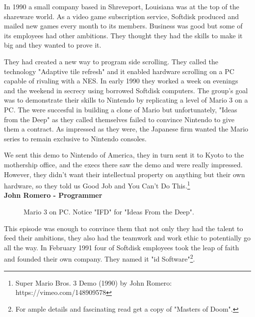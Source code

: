 \documentclass[book.tex]{subfiles}
\begin{document}
In 1990 a small company based in Shreveport, Louisiana was at the top of the shareware world. As a video game subscription service, Softdisk produced and mailed new games every month to its members. Business was good but some of its employees had other ambitions. They thought they had the skills to make it big and they wanted to prove it.\\
\par
They had created a new way to program side scrolling. They called the technology "Adaptive tile refresh" and it enabled hardware scrolling on a PC capable of rivaling with a NES. In early 1990 they worked a week on evenings and the weekend in secrecy using borrowed Softdisk computers. The group's goal was to demonstrate their skills to Nintendo by replicating a level of Mario 3 on a PC. The were succesful in building a clone of Mario  but unfortunately, "Ideas from the Deep" as they called themselves failed to convince Nintendo to give them a contract. As impressed as they were, the Japanese firm wanted the Mario series to remain exclusive to Nintendo consoles.\\
\par
\begin{fancyquotes}
We sent this demo to Nintendo of America, they in turn sent it to Kyoto to the mothership office, and the execs there saw the demo and were really impressed. However, they didn't want their intellectual property on anything but their own hardware, so they told us Good Job and You Can't Do This.\footnote{Super Mario Bros. 3 Demo (1990) by John Romero: https://vimeo.com/148909578}
 \bigskip \\
\textbf{John Romero - Programmer}
 \end{fancyquotes}

 \begin{figure}[H]
\caption{Mario 3 on PC. Notice "IFD" for "Ideas From the Deep".}
\end{figure}

\par
This episode was enough to convince them that not only they had the talent to feed their ambitions, they also had the teamwork and work ethic to potentially go all the way. In February 1991 four of Softdisk employees took the leap of faith and founded their own company. They named it "id Software"\footnote{For ample details and fascinating read get a copy of "Masters of Doom".}. 
\end{document}
